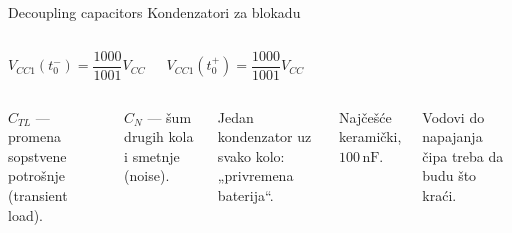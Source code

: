 \begin{frame}[label=08-s008]{Decoupling capacitors}
\setlength{\parskip}{2pt}
Kondenzatori za blokadu\par\smallskip
\begin{columns}[c,onlytextwidth]
\centering
{}
$V_{CC1}(t_0^-)=\dfrac{1000}{1001}V_{CC}$\par\medskip
$V_{CC1}(t_0^+)=\dfrac{1000}{1001}V_{CC}$
\end{columns}\smallskip
\begin{columns}[T,onlytextwidth]
$C_{TL}$ — promena sopstvene potrošnje (transient load).\par
$C_N$ — šum drugih kola i smetnje (noise).\par\smallskip
\centering
{}
Jedan kondenzator uz svako kolo: „privremena baterija“.\par\medskip
Najčešće keramički, $100\,\mathrm{nF}$.\par\medskip
Vodovi do napajanja čipa treba da budu što kraći.
\end{columns}
\end{frame}
